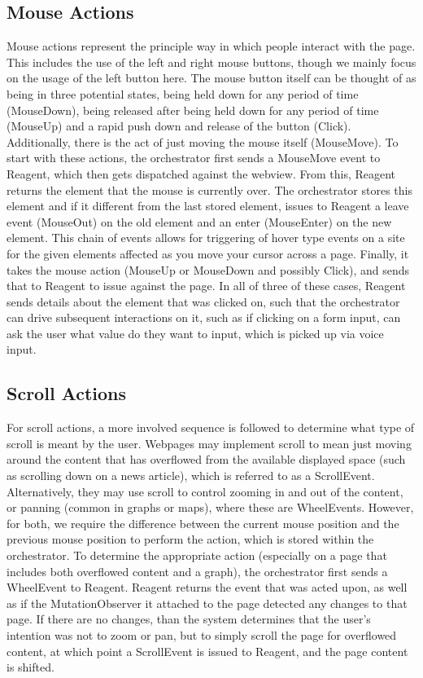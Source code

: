 \subsection{Mouse Actions}
Mouse actions represent the principle way in which people interact with the
page. This includes the use of the left and right mouse buttons, though we
mainly focus on the usage of the left button here. The mouse button itself can
be thought of as being in three potential states, being held down for any period
of time (MouseDown), being released after being held down for any period of time
(MouseUp) and a rapid push down and release of the button (Click). Additionally,
there is the act of just moving the mouse itself (MouseMove). To start with
these actions, the orchestrator first sends a MouseMove event to Reagent, which
then gets dispatched against the webview. From this, Reagent returns the element
that the mouse is currently over. The orchestrator stores this element and if it
different from the last stored element, issues to Reagent a leave event
(MouseOut) on the old element and an enter (MouseEnter) on the new element. This
chain of events allows for triggering of hover type events on a site for the
given elements affected as you move your cursor across a page. Finally, it takes
the mouse action (MouseUp or MouseDown and possibly Click), and sends that to
Reagent to issue against the page. In all of three of these cases,
Reagent sends details about the element that was clicked on, such that the
orchestrator can drive subsequent interactions on it, such as if clicking on a
form input, can ask the user what value do they want to input, which is picked
up via voice input.

\subsection{Scroll Actions}
For scroll actions, a more involved sequence is followed to determine what type
of scroll is meant by the user. Webpages may implement scroll to mean just
moving around the content that has overflowed from the available displayed space
(such as scrolling down on a news article), which is referred to as a
ScrollEvent. Alternatively, they may use scroll to control zooming in and out of
the content, or panning (common in graphs or maps), where these are WheelEvents.
However, for both, we require the difference between the current mouse position
and the previous mouse position to perform the action, which is stored within
the orchestrator. To determine the appropriate action (especially on a page that
includes both overflowed content and a graph), the orchestrator first sends a
WheelEvent to Reagent. Reagent returns the event that was acted upon, as well as
if the MutationObserver it attached to the page detected any changes to that
page. If there are no changes, than the system determines that the user's
intention was not to zoom or pan, but to simply scroll the page for overflowed
content, at which point a ScrollEvent is issued to Reagent, and the page content
is shifted.
